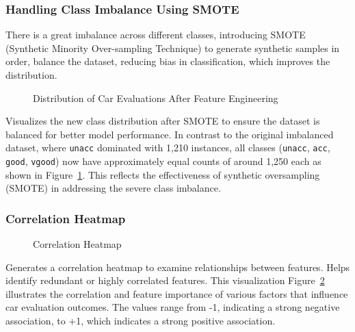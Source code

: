\documentclass[
  letterpaper,
  DIV=11,
  numbers=noendperiod]{scrartcl}
\begin{document}
\subsubsection{Handling Class Imbalance Using
SMOTE}\label{handling-class-imbalance-using-smote}

There is a great imbalance across different classes, introducing SMOTE
(Synthetic Minority Over-sampling Technique) to generate synthetic
samples in order, balance the dataset, reducing bias in classification,
which improves the distribution.

\begin{figure}


\caption{\label{fig-car_distri_after_enginerring_plot}Distribution of
Car Evaluations After Feature Engineering}

\end{figure}%

Visualizes the new class distribution after SMOTE to ensure the dataset
is balanced for better model performance. In contrast to the original
imbalanced dataset, where \texttt{unacc} dominated with 1,210 instances,
all classes (\texttt{unacc}, \texttt{acc}, \texttt{good},
\texttt{vgood}) now have approximately equal counts of around 1,250 each
as shown in Figure~\ref{fig-car_distri_after_enginerring_plot}. This
reflects the effectiveness of synthetic oversampling (SMOTE) in
addressing the severe class imbalance.

\subsubsection{Correlation Heatmap}\label{correlation-heatmap}

\begin{figure}


\caption{\label{fig-corr_heatmap}Correlation Heatmap}

\end{figure}%

Generates a correlation heatmap to examine relationships between
features. Helps identify redundant or highly correlated features. This
visualization Figure~\ref{fig-corr_heatmap} illustrates the correlation
and feature importance of various factors that influence car evaluation
outcomes. The values range from -1, indicating a strong negative
association, to +1, which indicates a strong positive association.
\end{document}
